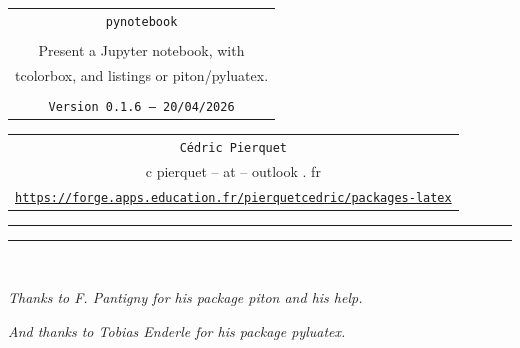 \documentclass[english,11pt,a4paper]{article}
\def\TPversion{0.1.6}
\def\TPdate{20/04/2026}
\begin{document}
\pagestyle{fancy}

\thispagestyle{empty}

\begin{center}
	\begin{minipage}{0.88\linewidth}
	\begin{tcolorbox}[colframe=yellow,colback=yellow!15]
		\begin{center}
			\begin{tabular}{c}
				{\Huge \texttt{pynotebook}}\\
				\\
				{\LARGE Present a Jupyter notebook, with} \\
				{\LARGE tcolorbox, and listings or piton/pyluatex.} \\
				\\
				{\small \texttt{Version \TPversion{} -- \TPdate}}
		\end{tabular}
		\end{center}
	\end{tcolorbox}
\end{minipage}
\end{center}

\begin{center}
	\begin{tabular}{c}
	\texttt{Cédric Pierquet}\\
	{\ttfamily c pierquet -- at -- outlook . fr}\\
	\texttt{\url{https://forge.apps.education.fr/pierquetcedric/packages-latex}}
\end{tabular}
\end{center}

\hrule


\hypertarget{matoc}{}

\tableofcontents

\vspace*{5mm}

\hrule

\vspace*{5mm}

\vfill~

\textit{\footnotesize Thanks to F. Pantigny for his package \textsf{piton} and his help.}

\textit{\footnotesize And thanks to Tobias Enderle for his package \textsf{pyluatex}.}

\pagebreak
\end{document}
